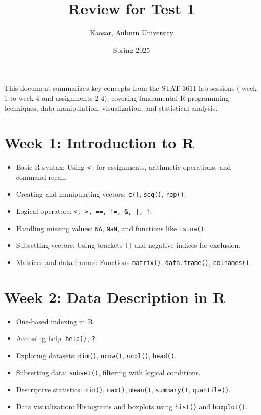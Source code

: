 \documentclass{article}
\begin{document}
\title{Review for Test 1}
\author{Kaosar, Auburn University}
\date{Spring 2025}
\maketitle


This document summarizes key concepts from the STAT 3611 lab sessions ( week 1 to week 4 and assignments 2-4), covering fundamental R programming techniques, data manipulation, visualization, and statistical analysis.

\section{Week 1: Introduction to R}
\begin{itemize}
    \item Basic R syntax: Using \texttt{<-} for assignments, arithmetic operations, and command recall.
    \item Creating and manipulating vectors: \texttt{c()}, \texttt{seq()}, \texttt{rep()}.
    \item Logical operators: \texttt{<, >, ==, !=, \&, |, !}.
    \item Handling missing values: \texttt{NA}, \texttt{NaN}, and functions like \texttt{is.na()}.
    \item Subsetting vectors: Using brackets \texttt{[]} and negative indices for exclusion.
    \item Matrices and data frames: Functions \texttt{matrix()}, \texttt{data.frame()}, \texttt{colnames()}.
\end{itemize}



\section{Week 2: Data Description in R}
\begin{itemize}
    \item One-based indexing in R.
    \item Accessing help: \texttt{help()}, \texttt{?}.
    \item Exploring datasets: \texttt{dim()}, \texttt{nrow()}, \texttt{ncol()}, \texttt{head()}.
    \item Subsetting data: \texttt{subset()}, filtering with logical conditions.
    \item Descriptive statistics: \texttt{min()}, \texttt{max()}, \texttt{mean()}, \texttt{summary()}, \texttt{quantile()}.
    \item Data visualization: Histograms and boxplots using \texttt{hist()} and \texttt{boxplot()}.
\end{itemize}
\end{document}
